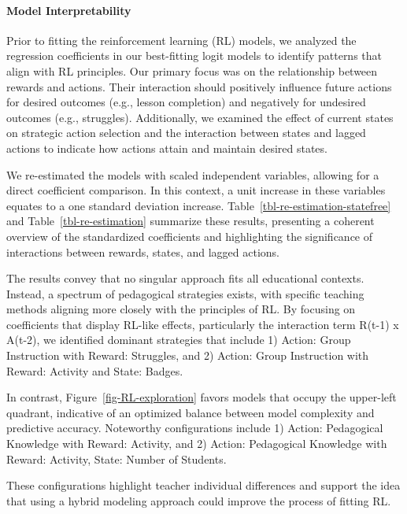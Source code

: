 \documentclass[
  number,
  preprint,
  3p,
  onecolumn]{elsarticle}
\let\oldparagraph\paragraph
\renewcommand{\paragraph}[1]{\oldparagraph{#1}\mbox{}}
\begin{document}
\paragraph{Model Interpretability}\label{model-interpretability}

Prior to fitting the reinforcement learning (RL) models, we analyzed the
regression coefficients in our best-fitting logit models to identify
patterns that align with RL principles. Our primary focus was on the
relationship between rewards and actions. Their interaction should
positively influence future actions for desired outcomes (e.g., lesson
completion) and negatively for undesired outcomes (e.g., struggles).
Additionally, we examined the effect of current states on strategic
action selection and the interaction between states and lagged actions
to indicate how actions attain and maintain desired states.

We re-estimated the models with scaled independent variables, allowing
for a direct coefficient comparison. In this context, a unit increase in
these variables equates to a one standard deviation increase.
Table~\ref{tbl-re-estimation-statefree} and
Table~\ref{tbl-re-estimation} summarize these results, presenting a
coherent overview of the standardized coefficients and highlighting the
significance of interactions between rewards, states, and lagged
actions.

The results convey that no singular approach fits all educational
contexts. Instead, a spectrum of pedagogical strategies exists, with
specific teaching methods aligning more closely with the principles of
RL. By focusing on coefficients that display RL-like effects,
particularly the interaction term R(t-1) x A(t-2), we identified
dominant strategies that include 1) Action: Group Instruction with
Reward: Struggles, and 2) Action: Group Instruction with Reward:
Activity and State: Badges.

In contrast, Figure~\ref{fig-RL-exploration} favors models that occupy
the upper-left quadrant, indicative of an optimized balance between
model complexity and predictive accuracy. Noteworthy configurations
include 1) Action: Pedagogical Knowledge with Reward: Activity, and 2)
Action: Pedagogical Knowledge with Reward: Activity, State: Number of
Students.

These configurations highlight teacher individual differences and
support the idea that using a hybrid modeling approach could improve the
process of fitting RL.
\end{document}
